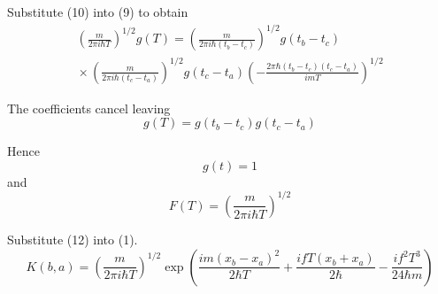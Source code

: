 \documentclass[12pt]{article}
\begin{document}
Substitute (10) into (9) to obtain
\begin{multline*}
\left(\frac{m}{2\pi i\hbar T}\right)^{1/2} g(T)
=\left(\frac{m}{2\pi i\hbar(t_b-t_c)}\right)^{1/2} g(t_b-t_c)
\\
{}\times
\left(\frac{m}{2\pi i\hbar(t_c-t_a)}\right)^{1/2} g(t_c-t_a)
\left(-\frac{2\pi\hbar(t_b-t_c)(t_c-t_a)}{imT}\right)^{1/2}
\end{multline*}

The coefficients cancel leaving
\begin{equation*}
g(T)=g(t_b-t_c)g(t_c-t_a)
\tag{11}
\end{equation*}

Hence
\begin{equation*}
g(t)=1
\end{equation*}
and
\begin{equation*}
F(T)=\left(\frac{m}{2\pi i\hbar T}\right)^{1/2}
\tag{12}
\end{equation*}

Substitute (12) into (1).
\begin{equation*}
K(b,a)=\left(\frac{m}{2\pi i\hbar T}\right)^{1/2}
\exp\left(
\frac{im(x_b-x_a)^2}{2\hbar T}
+\frac{ifT(x_b+x_a)}{2\hbar}
-\frac{if^2T^3}{24\hbar m}
\right)
\end{equation*}
\end{document}
